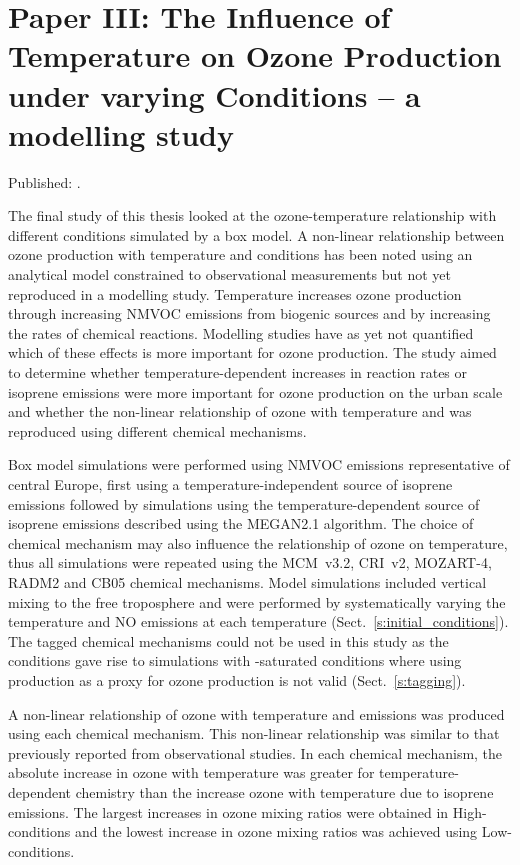 \singlespacing
\section[Paper III]{Paper III: The Influence of Temperature on Ozone Production under varying  Conditions -- a modelling study} \label{s:T-O3_results}
\onehalfspacing

Published: .
\vspace{5mm}

The final study of this thesis looked at the ozone-temperature relationship with different  conditions simulated by a box model.
A non-linear relationship between ozone production with temperature and  conditions has been noted using an analytical model constrained to observational measurements but not yet reproduced in a modelling study.
Temperature increases ozone production through increasing NMVOC emissions from biogenic sources and by increasing the rates of chemical reactions.
Modelling studies have as yet not quantified which of these effects is more important for ozone production.
The study aimed to determine whether temperature-dependent increases in reaction rates or isoprene emissions were more important for ozone production on the urban scale and whether the non-linear relationship of ozone with temperature and  was reproduced using different chemical mechanisms.

Box model simulations were performed using NMVOC emissions representative of central Europe, first using a temperature-independent source of isoprene emissions followed by simulations using the temperature-dependent source of isoprene emissions described using the MEGAN2.1 algorithm.
The choice of chemical mechanism may also influence the relationship of ozone on temperature, thus all simulations were repeated using the MCM~v3.2, CRI~v2, MOZART-4, RADM2 and CB05 chemical mechanisms.
Model simulations included vertical mixing to the free troposphere and were performed by systematically varying the temperature and NO emissions at each temperature (Sect.~\ref{s:initial_conditions}).
The tagged chemical mechanisms could not be used in this study as the  conditions gave rise to simulations with -saturated conditions where using  production as a proxy for ozone production is not valid (Sect.~\ref{s:tagging}).

A non-linear relationship of ozone with temperature and  emissions was produced using each chemical mechanism. 
This non-linear relationship was similar to that previously reported from observational studies.  
In each chemical mechanism, the absolute increase in ozone with temperature was greater for temperature-dependent chemistry than the increase ozone with temperature due to isoprene emissions.
The largest increases in ozone mixing ratios were obtained in High- conditions and the lowest increase in ozone mixing ratios was achieved using Low- conditions.

